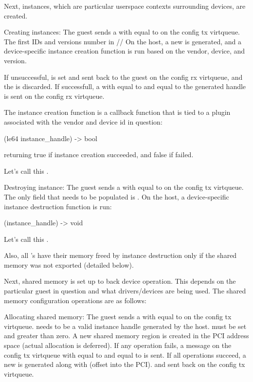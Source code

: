 Next, instances, which are particular userspace contexts surrounding devices, are created.

Creating instances:
The guest sends a 
with  equal to 
on the config tx virtqueue.
The first IDs and versions number in //
On the host,
a new  is generated,
and a device-specific instance creation function is run
based on the vendor, device, and version.

If unsuccessful,  is set and sent back to the guest
on the config rx virtqueue, and the  is discarded.
If successfull,
a 
with  equal to 
and  equal to the generated handle
is sent on the config rx virtqueue.

The instance creation function is a callback function that is tied
to a plugin associated with the vendor and device id in question:

(le64 instance_handle) -> bool

returning true if instance creation succeeded,
and false if failed.

Let's call this .

Destroying instance:
The guest sends a 
with  equal to 
on the config tx virtqueue.
The only field that needs to be populated
is .
On the host, a device-specific instance destruction function is run:

(instance_handle) -> void

Let's call this .

Also, all 's have their memory freed by instance destruction
only if the shared memory was not exported (detailed below).

Next, shared memory is set up to back device operation.
This depends on the particular guest in question and what drivers/devices are being used.
The shared memory configuration operations are as follows:

Allocating shared memory:
The guest sends a 
with  equal to 
on the config tx virtqueue.
 needs to be a valid instance handle generated by the host.
 must be set and greater than zero.
A new shared memory region is created in the PCI address space (actual allocation is deferred).
If any operation fails, a message on the config tx virtqueue
with  equal to 
and  equal to 
is sent.
If all operations succeed,
a new  is generated along with  (offset into the PCI).
and sent back on the config tx virtqueue.

